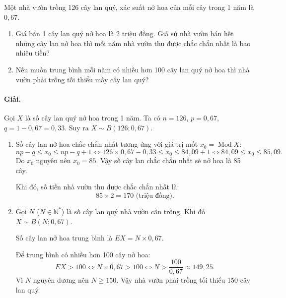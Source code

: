 \begin{vidu}[VD 4]
Một nhà vườn trồng 126 cây lan quý, xác suất nở hoa của mỗi cây trong 1 năm là $0{,}67$.
\begin{enumerate}[label=\arabic*)]
    \item Giá bán 1 cây lan quý nở hoa là 2 triệu đồng. Giả sử nhà vườn bán hết những cây lan nở hoa thì mỗi năm nhà vườn thu được chắc chắn nhất là bao nhiêu tiền?
    \item Nếu muốn trung bình mỗi năm có nhiều hơn 100 cây lan quý nở hoa thì nhà vườn phải trồng tối thiểu mấy cây lan quý?
\end{enumerate}

\paragraph{Giải.}
Gọi $X$ là số cây lan quý nở hoa trong 1 năm. Ta có $n = 126$, $p = 0{,}67$, $q = 1 - 0{,}67 = 0{,}33$. Suy ra $X \sim B(126; 0{,}67)$.

\begin{enumerate}[label=\arabic*)]
    \item Số cây lan nở hoa chắc chắn nhất tương ứng với giá trị mốt $x_0 = \operatorname{Mod} X$:
    \[
    np - q \le x_0 \le np - q + 1 \iff 126 \times 0{,}67 - 0{,}33 \le x_0 \le 84{,}09 + 1 \iff 84{,}09 \le x_0 \le 85{,}09.
    \]
    Do $x_0$ nguyên nên $x_0 = 85$. Vậy số cây lan chắc chắn nhất sẽ nở hoa là 85 cây.
    
    Khi đó, số tiền nhà vườn thu được chắc chắn nhất là:
    \[
    85 \times 2 = 170 \text{ (triệu đồng)}.
    \]

    \item Gọi $N$ ($N \in \mathbb{N}^*$) là số cây lan quý nhà vườn cần trồng. Khi đó $X \sim B(N; 0{,}67)$.
    
    Số cây lan nở hoa trung bình là $EX = N \times 0{,}67$.
    
    Để trung bình có nhiều hơn 100 cây nở hoa:
    \[
    EX > 100 \iff N \times 0{,}67 > 100 \iff N > \frac{100}{0{,}67} \approx 149{,}25.
    \]
    Vì $N$ nguyên dương nên $N \ge 150$. Vậy nhà vườn phải trồng tối thiểu 150 cây lan quý.
\end{enumerate}
\end{vidu}

